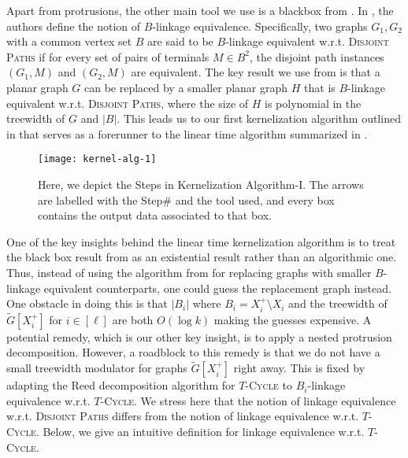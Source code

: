 \documentclass{article}
\numberwithin{claimcounter}{lemma}
\newcommand{\tcycle}{$T$-\textsc{Cycle}\xspace}
\newcommand{\dispaths}{\textsc{Disjoint Paths}\xspace}
\begin{document}
Apart from protrusions, the other main tool we use is a blackbox from \cite{DBLP:conf/focs/0001Z23}. In \cite{DBLP:conf/focs/0001Z23}, the authors define the notion of $B$-linkage equivalence. Specifically, two graphs $G_1,G_2$ with a common vertex set $B$ are said to be $B$-linkage equivalent w.r.t. \dispaths if for every set of pairs of terminals $M \in B^2$, the disjoint path instances $(G_1,M)$ and $(G_2,M)$ are equivalent. The key result we use from \cite{DBLP:conf/focs/0001Z23} is that  a planar graph $G$ can be replaced by a smaller planar graph $H$ that is $B$-linkage equivalent w.r.t. \dispaths, where the size of $H$ is polynomial in the treewidth of $G$ and $|B|$. This leads us to our first kernelization algorithm outlined in  that serves as a forerunner to the linear time algorithm summarized in .



\begin{figure}[H]
\centering
\texttt{[image: kernel-alg-1]}
\caption{Here, we depict the Steps in Kernelization Algorithm-I. The arrows are labelled with the Step$\#$ and the tool used, and every box contains the output data associated to that box.} \label{fig:kerfigone}
\end{figure}

One of the key insights behind the linear time kernelization algorithm is to treat the black box result from   \cite{DBLP:conf/focs/0001Z23} as an existential result rather than an algorithmic one. Thus, instead of using the algorithm from \cite{DBLP:conf/focs/0001Z23} for replacing graphs with smaller $B$-linkage equivalent counterparts, one could guess the replacement graph instead. One obstacle in doing this is that $|B_i|$ where $B_i = X_i^+ \setminus X_i$ and the treewidth of $\tilde{G}[X_i^+]$ for $i\in [\ell]$ are both $O(\log k)$ making the guesses expensive. A potential remedy, which is our other key insight, is to apply a nested protrusion decomposition. However, a roadblock to  this remedy is that we do not have a small treewidth modulator for graphs $\tilde{G}[X_i^+]$ right away. This is fixed by adapting the Reed decomposition algorithm for \textsc{$T$-Cycle}  to  $B_i$-linkage equivalence w.r.t. \tcycle. We stress here that the notion of linkage equivalence w.r.t. \dispaths differs from the notion of linkage equivalence w.r.t. \tcycle. Below, we give an  intuitive definition for linkage equivalence w.r.t. \tcycle. 
\end{document}
